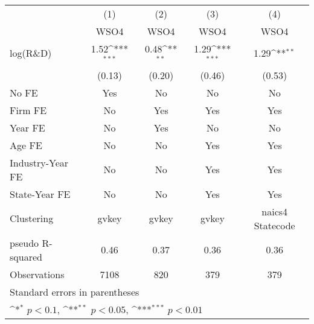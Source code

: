{
\def\sym#1{\ifmmode^{#1}\else\(^{#1}\)\fi}
\begin{tabular}{l*{4}{c}}
\toprule
                    &\multicolumn{1}{c}{(1)}&\multicolumn{1}{c}{(2)}&\multicolumn{1}{c}{(3)}&\multicolumn{1}{c}{(4)}\\
                    &\multicolumn{1}{c}{WSO4}&\multicolumn{1}{c}{WSO4}&\multicolumn{1}{c}{WSO4}&\multicolumn{1}{c}{WSO4}\\
\midrule
log(R\&D)           &        1.52\sym{***}&        0.48\sym{**} &        1.29\sym{***}&        1.29\sym{**} \\
                    &      (0.13)         &      (0.20)         &      (0.46)         &      (0.53)         \\
\addlinespace
No FE               &         Yes         &          No         &          No         &          No         \\
\addlinespace
Firm FE             &          No         &         Yes         &         Yes         &         Yes         \\
\addlinespace
Year FE             &          No         &         Yes         &          No         &          No         \\
\addlinespace
Age FE              &          No         &          No         &         Yes         &         Yes         \\
\addlinespace
Industry-Year FE    &          No         &          No         &         Yes         &         Yes         \\
\addlinespace
State-Year FE       &          No         &          No         &         Yes         &         Yes         \\
\midrule
Clustering          &       gvkey         &       gvkey         &       gvkey         &naics4 Statecode         \\
pseudo R-squared    &        0.46         &        0.37         &        0.36         &        0.36         \\
Observations        &        7108         &         820         &         379         &         379         \\
\bottomrule
\multicolumn{5}{l}{\footnotesize Standard errors in parentheses}\\
\multicolumn{5}{l}{\footnotesize \sym{*} \(p<0.1\), \sym{**} \(p<0.05\), \sym{***} \(p<0.01\)}\\
\end{tabular}
}
